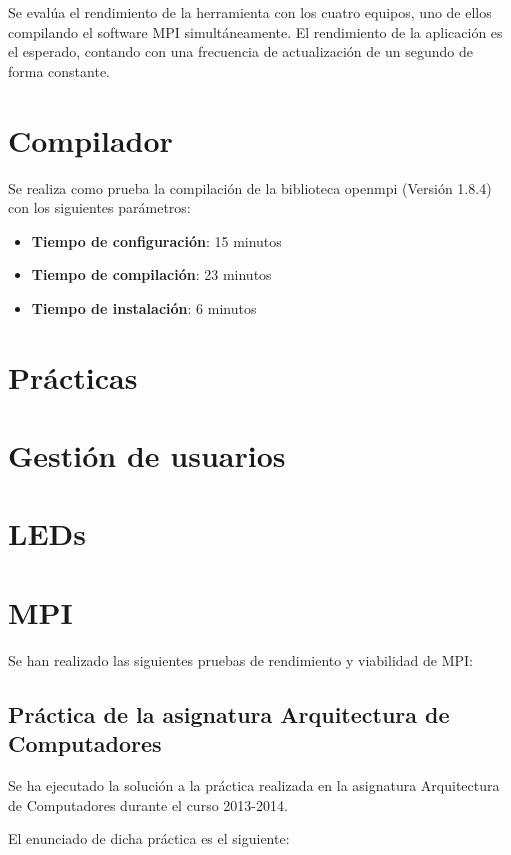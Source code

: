 \documentclass{article}
\begin{document}
Se evalúa el rendimiento de la herramienta con los cuatro equipos, uno de ellos compilando el software MPI simultáneamente. El rendimiento de la aplicación es el esperado, contando con una frecuencia de actualización de un segundo de forma constante.

\section{Compilador}

Se realiza como prueba la compilación de la biblioteca openmpi (Versión 1.8.4) con los siguientes parámetros:

\texttt{}
\begin{itemize}
\item \textbf{Tiempo de configuración}: 15 minutos
\item \textbf{Tiempo de compilación}: 23 minutos
\item \textbf{Tiempo de instalación}: 6 minutos
\end{itemize}

\section{Prácticas}

\section{Gestión de usuarios}

\section{LEDs}

\section{MPI}

Se han realizado las siguientes pruebas de rendimiento y viabilidad de MPI:

\subsection{Práctica de la asignatura Arquitectura de Computadores}

Se ha ejecutado la solución a la práctica realizada en la asignatura Arquitectura de Computadores durante el curso 2013-2014.

El enunciado de dicha práctica es el siguiente:
\end{document}

